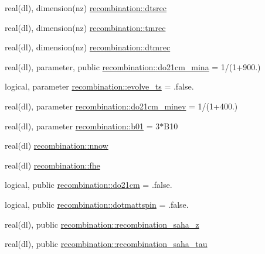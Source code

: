 \begin{DoxyCompactItemize}
\item 
real(dl), dimension(nz) \mbox{\hyperlink{namespacerecombination_a05ee59d76dcf3b0345da845ed7980073}{recombination\+::dtsrec}}
\item 
real(dl), dimension(nz) \mbox{\hyperlink{namespacerecombination_a49d87db76377445504ec6505faa4da09}{recombination\+::tmrec}}
\item 
real(dl), dimension(nz) \mbox{\hyperlink{namespacerecombination_a56809fd170a698f38efdc76471379237}{recombination\+::dtmrec}}
\item 
real(dl), parameter, public \mbox{\hyperlink{namespacerecombination_a9f9ad56161c0922d8b742775d30db0dd}{recombination\+::do21cm\+\_\+mina}} = 1/(1+900.)
\item 
logical, parameter \mbox{\hyperlink{namespacerecombination_ab91e25d9cc8fed5d1aa39540e9f90c59}{recombination\+::evolve\+\_\+ts}} = .false.
\item 
real(dl), parameter \mbox{\hyperlink{namespacerecombination_a78245c71ab308bd902e38d4505ff4554}{recombination\+::do21cm\+\_\+minev}} = 1/(1+400.)
\item 
real(dl), parameter \mbox{\hyperlink{namespacerecombination_ac87df6d66d9a2c678cf5712166b0307a}{recombination\+::b01}} = 3$\ast$B10
\item 
real(dl) \mbox{\hyperlink{namespacerecombination_a9c154008489ae26b92e9e4b41df00e80}{recombination\+::nnow}}
\item 
real(dl) \mbox{\hyperlink{namespacerecombination_a0bcf491993bc386ebe7e2f6fafe228a3}{recombination\+::fhe}}
\item 
logical, public \mbox{\hyperlink{namespacerecombination_a7789f3edc0804a55e6ad9e9ad4450848}{recombination\+::do21cm}} = .false.
\item 
logical, public \mbox{\hyperlink{namespacerecombination_ae0472591a7f5d7f85297b5123245e4a5}{recombination\+::dotmattspin}} = .false.
\item 
real(dl), public \mbox{\hyperlink{namespacerecombination_a846415ba803734dc947b1f45e5e7f5ce}{recombination\+::recombination\+\_\+saha\+\_\+z}}
\item 
real(dl), public \mbox{\hyperlink{namespacerecombination_af55a05267a423d23ad90deef0980c751}{recombination\+::recombination\+\_\+saha\+\_\+tau}}
\end{DoxyCompactItemize}
